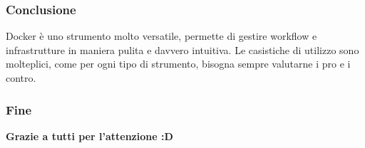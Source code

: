 \documentclass{beamer}
\begin{document}

\begin{frame}
    \frametitle{Conclusione}
    Docker \`e uno strumento molto versatile, permette di gestire workflow e infrastrutture in maniera pulita e davvero intuitiva. Le casistiche di utilizzo
    sono molteplici, come per ogni tipo di strumento, bisogna sempre valutarne i pro e i contro.
\end{frame}


\begin{frame}
    \frametitle{Fine}
    \begin{center}
        \textbf{Grazie a tutti per l'attenzione :D}
    \end{center}
\end{frame}

\end{document}
